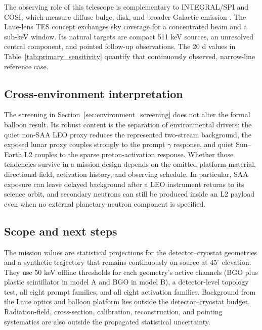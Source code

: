 \documentclass[11pt]{article}
\begin{document}
The observing role of this telescope is complementary to INTEGRAL/SPI and COSI,
which measure diffuse bulge, disk, and broader Galactic emission
\cite{Siegert2016AA,Kierans2020,Siegert2020COSI,Yoneda2025,Karwin2023}. The
Laue-lens TES concept exchanges sky coverage for a concentrated beam and a
sub-keV window. Its natural targets are compact 511 keV sources, an unresolved
central component, and pointed follow-up observations. The 20 d values in
Table~\ref{tab:primary_sensitivity} quantify that continuously observed,
narrow-line reference case.

\subsection{Cross-environment interpretation}

The screening in Section~\ref{sec:environment_screening} does not alter the
formal balloon result. Its robust content is the separation of environmental
drivers: the quiet non-SAA LEO proxy reduces the represented two-stream
background, the exposed lunar proxy couples strongly to the prompt
$\gamma$ response, and quiet Sun--Earth L2 couples to the sparse
proton-activation response. Whether those tendencies survive in a mission
design depends on the omitted platform material, directional field, activation
history, and observing schedule. In particular, SAA exposure can leave delayed
background after a LEO instrument returns to its science orbit, and secondary
neutrons can still be produced inside an L2 payload even when no external
planetary-neutron component is specified.

\subsection{Scope and next steps}
\label{subsec:limitations}

The mission values are statistical projections for the detector--cryostat
geometries and a synthetic trajectory that remains continuously on source at
$45^\circ$ elevation. They use 50 keV offline thresholds for each geometry's
active channels (BGO plus plastic scintillator in model A and BGO in model B),
a detector-level topology test, all eight prompt families, and all eight
activation families. Background from the Laue optics and balloon platform lies
outside the detector--cryostat budget. Radiation-field, cross-section,
calibration, reconstruction, and pointing systematics are also outside the
propagated statistical uncertainty.
\end{document}
